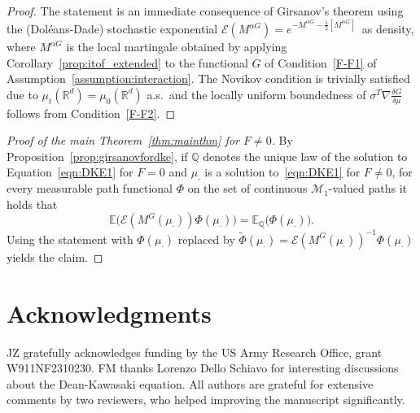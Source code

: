 \documentclass{article}
\newcommand{\R}{\mathbb{R}}
\newcommand{\E}{\mathbb{E}}
\newcommand{\F}{F}
\newcommand{\cM}{\mathcal M}
\begin{document}
\begin{proof}

  The statement is an immediate consequence of Girsanov's theorem using the (Dol\'eans-Dade) stochastic
  exponential $\mathcal E(M^{\alpha G})=e^{-M^{\alpha G}_\cdot - \frac{1}{2}[M^{\alpha G}]_\cdot}$ as density,
  where $M^{\alpha G}$ is the local martingale obtained by applying Corollary~\ref{prop:itof_extended} to the
  functional $G$ of Condition~\ref{F-F1} of Assumption~\ref{assumption:interaction}. The Novikov condition is
  trivially satisfied due to $\mu_t(\R^d) = \mu_0(\R^d)$ a.s.\ and the locally uniform boundedness of
  $\sigma^T \nabla \frac{\delta G}{\delta \mu}$ follows from Condition~\ref{F-F2}.
\end{proof}

\begin{proof}[Proof of the main Theorem~\ref{thm:mainthm} for $\F\ne 0$] By
  Proposition~\ref{prop:girsanovfordke}, if $\mathbb Q$ denotes the unique law of the solution to
  Equation~\eqref{eqn:DKE1} for $\F=0$ and $\mu_\cdot$ is a solution to~\eqref{eqn:DKE1} for $\F\ne 0$, for
  every measurable path functional $\Phi$ on the set of continuous $\cM_1$-valued paths it holds that
  \begin{equation*}
    \mathbb E\bigl(\mathcal E(M^G(\mu_\cdot)) \Phi(\mu_\cdot)\bigr) =
    \E_{\mathbb Q}\bigl(\Phi(\mu_\cdot)\bigr).
  \end{equation*} 
  Using the statement with $\Phi(\mu_\cdot)$ replaced by
  $\tilde \Phi(\mu_\cdot) = \mathcal E(M^G(\mu_\cdot))^{-1}\Phi(\mu_\cdot)$ yields the claim.
\end{proof}





\section*{Acknowledgments}
JZ gratefully acknowledges funding by the US Army Research Office, grant W911NF2310230.  FM thanks Lorenzo
Dello Schiavo for interesting discussions about the Dean-Kawasaki equation. All authors are grateful for
extensive comments by two reviewers, who helped improving the manuscript significantly.

\printbibliography
\end{document}
